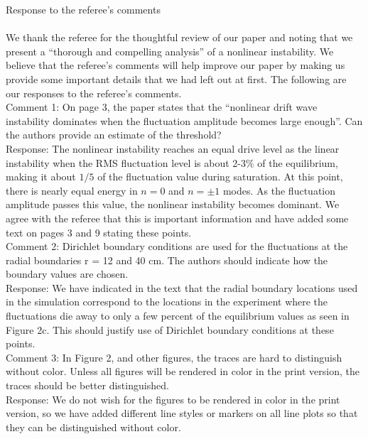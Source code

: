 \documentclass[12pt]{article}
\begin{document}
Response to the referee's comments \\ \\ 

We thank the referee for the thoughtful review of our paper and noting that we present a ``thorough and compelling analysis'' of a nonlinear instability. We believe that the referee's comments will help
improve our paper by making us provide some important details that we had left out at first. The following are our responses to the referee's comments. \\

Comment 1:   On page 3, the paper states that the “nonlinear drift wave instability dominates when
the fluctuation amplitude becomes large enough”. Can the authors provide an estimate of the threshold? \\

Response: The nonlinear instability reaches an equal drive level as the linear instability when the RMS fluctuation level is about 2-3$\%$ of the equilibrium, making it about $1/5$ 
of the fluctuation value during saturation. At this point, there is nearly equal energy in $n=0$ and $n= \pm 1$ modes. 
As the fluctuation amplitude passes this value, the nonlinear instability becomes dominant. We agree with the referee that this is important information and
have added some text on pages 3 and 9 stating these points. \\


Comment 2:    Dirichlet boundary conditions are used for the fluctuations at the radial boundaries r = 12 and 40 cm. The authors should indicate how the boundary values are chosen. \\

Response: We have indicated in the text that the radial boundary locations used in the simulation correspond to the locations in the experiment where the fluctuations die away to only
a few percent of the equilibrium values as seen in Figure 2c. This should justify use of Dirichlet boundary conditions at these points. \\

Comment 3:  In Figure 2, and other figures, the traces are hard to distinguish without color. Unless all figures will be rendered in color in the print version, the traces should be better
distinguished. \\

Response: We do not wish for the figures to be rendered in color in the print version, so we have added different line styles or markers on all line plots so that they can be 
distinguished without color. \\
\end{document}

